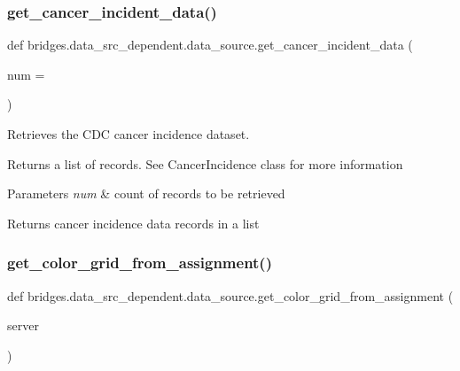 \subsubsection{\texorpdfstring{get\+\_\+cancer\+\_\+incident\+\_\+data()}{get\_cancer\_incident\_data()}}
{\footnotesize\ttfamily def bridges.\+data\+\_\+src\+\_\+dependent.\+data\+\_\+source.\+get\+\_\+cancer\+\_\+incident\+\_\+data (\begin{DoxyParamCaption}\item[{}]{num = {} }\end{DoxyParamCaption})}



Retrieves the C\+DC cancer incidence dataset. 

Returns a list of records. See Cancer\+Incidence class for more information


\begin{DoxyParams}{Parameters}
{\em num} & count of records to be retrieved \\
\hline
\end{DoxyParams}
\begin{DoxyReturn}{Returns}
cancer incidence data records in a list 
\end{DoxyReturn}
\mbox{\label{namespacebridges_1_1data__src__dependent_1_1data__source_a87295c22accd698a4573e9f4287c4096}} 
\subsubsection{\texorpdfstring{get\+\_\+color\+\_\+grid\+\_\+from\+\_\+assignment()}{get\_color\_grid\_from\_assignment()}}
{\footnotesize\ttfamily def bridges.\+data\+\_\+src\+\_\+dependent.\+data\+\_\+source.\+get\+\_\+color\+\_\+grid\+\_\+from\+\_\+assignment (\begin{DoxyParamCaption}\item[{}]{server }\end{DoxyParamCaption})}



